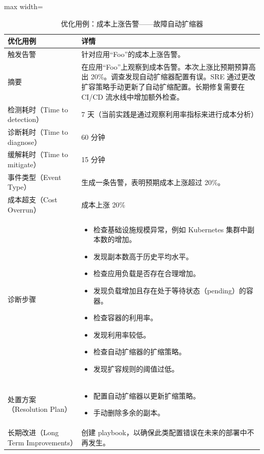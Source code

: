 \begin{table}[H]
\centering
\caption{优化用例：成本上涨告警——故障自动扩缩器}
\label{tab:e26}
\begin{adjustbox}{max width=\linewidth}
\begin{tabular}{@{}p{3.2cm}p{11cm}@{}}
\toprule
\textbf{优化用例} & \textbf{详情} \\
\midrule
触发告警 & 针对应用“Foo”的成本上涨告警。 \\
\addlinespace
摘要 & 在应用“Foo”上观察到成本告警。本次上涨比预期预算高出 20\%。调查发现自动扩缩器配置有误。SRE 通过更改扩容策略手动更新了自动扩缩配置。长期修复需要在 CI/CD 流水线中增加额外检查。 \\
\addlinespace
检测耗时（Time to detection） & 7 天（当前实践是通过观察利用率指标来进行成本分析） \\
诊断耗时（Time to diagnose） & 60 分钟 \\
缓解耗时（Time to mitigate） & 15 分钟 \\
事件类型（Event Type） & 生成一条告警，表明预期成本上涨超过 20\%。 \\
成本超支（Cost Overrun） & 成本上涨 20\% \\
\addlinespace
诊断步骤 &
\begin{itemize}[leftmargin=*,nosep]
\item 检查基础设施规模异常，例如 Kubernetes 集群中副本数的增加。
\item 发现副本数高于历史平均水平。
\item 检查应用负载是否存在合理增加。
\item 发现负载增加且存在处于等待状态（pending）的容器。
\item 检查容器的利用率。
\item 发现利用率较低。
\item 检查自动扩缩器的扩缩策略。
\item 发现扩容规则的阈值过低。
\end{itemize} \\
\addlinespace
处置方案（Resolution Plan） &
\begin{itemize}[leftmargin=*,nosep]
\item 配置自动扩缩器以更新扩缩策略。
\item 手动删除多余的副本。
\end{itemize} \\
\addlinespace
长期改进（Long Term Improvements） & 创建 playbook，以确保此类配置错误在未来的部署中不再发生。 \\
\bottomrule
\end{tabular}
\end{adjustbox}
\end{table}

